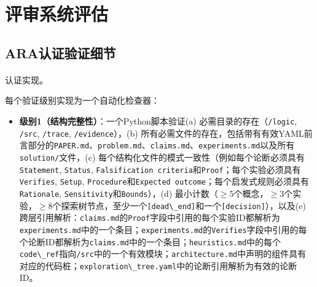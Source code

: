\documentclass[
]{article}
\makeatletter
\let\oldparagraph\paragraph
\renewcommand{\paragraph}{
    \@ifstar
      \xxxParagraphStar
      \xxxParagraphNoStar
  }
\newcommand{\xxxParagraphStar}[1]{\oldparagraph*{#1}\mbox{}}
\newcommand{\xxxParagraphNoStar}[1]{\oldparagraph{#1}\mbox{}}
\newcommand{\passthrough}[1]{#1}
\providecommand{\tightlist}{%
  \setlength{\itemsep}{0pt}\setlength{\parskip}{0pt}}
\theoremstyle{definition}
\makeatother
\begin{document}
\section{评审系统评估}\label{sec-app-review-system}

\subsection{ARA认证验证细节}\label{sec-app-seal-details}

\paragraph{认证实现。}\label{ux8ba4ux8bc1ux5b9eux73b0}

每个验证级别实现为一个自动化检查器：

\begin{itemize}
\tightlist
\item
  \textbf{级别1（结构完整性）}：一个Python脚本验证(a)
  必需目录的存在（\passthrough{\lstinline!/logic!},
  \passthrough{\lstinline!/src!}, \passthrough{\lstinline!/trace!},
  \passthrough{\lstinline!/evidence!}），(b)
  所有必需文件的存在，包括带有有效YAML前言部分的\passthrough{\lstinline!PAPER.md!}、\passthrough{\lstinline!problem.md!}、\passthrough{\lstinline!claims.md!}、\passthrough{\lstinline!experiments.md!}以及所有\passthrough{\lstinline!solution/!}文件，(c)
  每个结构化文件的模式一致性（例如每个论断必须具有\passthrough{\lstinline!Statement!},
  \passthrough{\lstinline!Status!},
  \passthrough{\lstinline!Falsification criteria!}和\passthrough{\lstinline!Proof!}；每个实验必须具有\passthrough{\lstinline!Verifies!},
  \passthrough{\lstinline!Setup!},
  \passthrough{\lstinline!Procedure!}和\passthrough{\lstinline!Expected outcome!}；每个启发式规则必须具有\passthrough{\lstinline!Rationale!},
  \passthrough{\lstinline!Sensitivity!}和\passthrough{\lstinline!Bounds!}），(d)
  最小计数（\(\geq 5\)个概念，\(\geq 3\)个实验，\(\geq 8\)个探索树节点，至少一个\passthrough{\lstinline![dead\_end]!}和一个\passthrough{\lstinline![decision]!}），以及(e)
  跨层引用解析：\passthrough{\lstinline!claims.md!}的\passthrough{\lstinline!Proof!}字段中引用的每个实验ID都解析为\passthrough{\lstinline!experiments.md!}中的一个条目；\passthrough{\lstinline!experiments.md!}的\passthrough{\lstinline!Verifies!}字段中引用的每个论断ID都解析为\passthrough{\lstinline!claims.md!}中的一个条目；\passthrough{\lstinline!heuristics.md!}中的每个\passthrough{\lstinline!code\_ref!}指向\passthrough{\lstinline!/src!}中的一个有效模块；\passthrough{\lstinline!architecture.md!}中声明的组件具有对应的代码桩；\passthrough{\lstinline!exploration\_tree.yaml!}中的论断引用解析为有效的论断ID。

\end{itemize}
\end{document}
